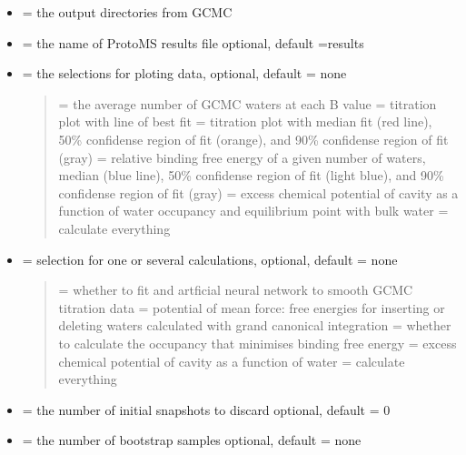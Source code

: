 \documentclass[letterpaper,10pt,english]{sphinxmanual}
\begin{document}
\begin{itemize}
\item {} 
 = the output directories from GCMC

\item {} 
 = the name of ProtoMS results file
optional, default =results

\item {} 
 = the selections for ploting data,
optional, default = none
\begin{quote}

 = the average number of GCMC waters at each B value
 = titration plot with line of best fit
 = titration plot with median fit (red line), 50\% confidense region of fit (orange), and 90\% confidense region of fit (gray)
 = relative binding free energy of a given number of waters, median (blue line), 50\% confidense region of fit (light blue), and 90\% confidense region of fit (gray)
 = excess chemical potential of cavity as a function of water occupancy and equilibrium point with bulk water
 = calculate everything
\end{quote}

\item {} 
 = selection for one or several calculations,
optional, default = none
\begin{quote}

 = whether to fit and artficial neural network to smooth GCMC titration data
 = potential of mean force: free energies for inserting or deleting waters calculated with grand canonical integration
 = whether to calculate the occupancy that minimises binding free energy
 = excess chemical potential of cavity as a function of water
 = calculate everything
\end{quote}

\item {} 
 = the number of initial snapshots to discard
optional, default = 0

\item {} 
 = the number of bootstrap samples
optional, default = none


\end{itemize}
\end{document}
